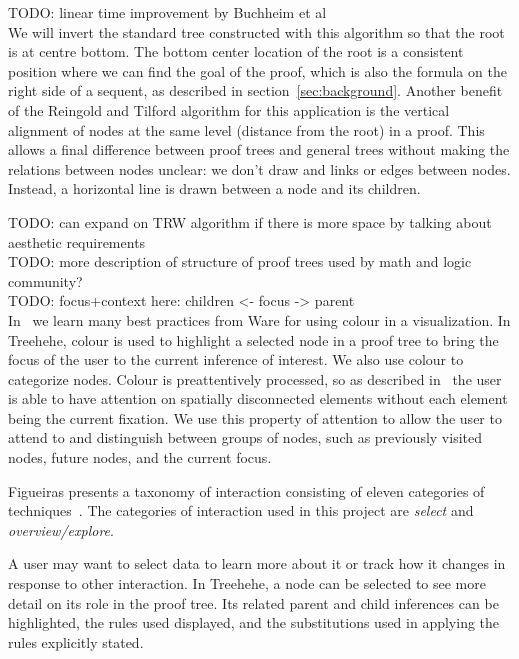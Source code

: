 \documentclass[conference]{IEEEtran}
\newcommand{\projectname}{Treehehe}
\begin{document}
TODO: linear time improvement by Buchheim et al \\

We will invert the standard tree constructed with this algorithm so that the root is at centre bottom. The bottom center location of the root is a consistent position where we can find the goal of the proof, which is also the formula on the right side of a sequent, as described in section~\ref{sec:background}. Another benefit of the Reingold and Tilford algorithm for this application is the vertical alignment of nodes at the same level (distance from the root) in a proof. This allows a final difference between proof trees and general trees without making the relations between nodes unclear: we don't draw and links or edges between nodes. Instead, a horizontal line is drawn between a node and its children.

TODO: can expand on TRW algorithm if there is more space by talking about aesthetic requirements \\

TODO: more description of structure of proof trees used by math and logic community? \\

TODO: focus+context here: children <- focus -> parent \\

In~\cite[Chapter 3]{infovis-ware} we learn many best practices from Ware for using colour in a visualization. In \projectname{}, colour is used to highlight a selected node in a proof tree to bring the focus of the user to the current inference of interest. We also use colour to categorize nodes. Colour is preattentively processed, so as described in~\cite[Chapter 11]{infovis-ware} the user is able to have attention on spatially disconnected elements without each element being the current fixation. We use this property of attention to allow the user to attend to and distinguish between groups of nodes, such as previously visited nodes, future nodes, and the current focus.

Figueiras presents a taxonomy of interaction consisting of eleven categories of techniques~\cite{interaction-figueiras}. The categories of interaction used in this project are \textit{select} and \textit{overview/explore}.

A user may want to select data to learn more about it or track how it changes in response to other interaction. In \projectname{}, a node can be selected to see more detail on its role in the proof tree. Its related parent and child inferences can be highlighted, the rules used displayed, and the substitutions used in applying the rules explicitly stated.
\end{document}
